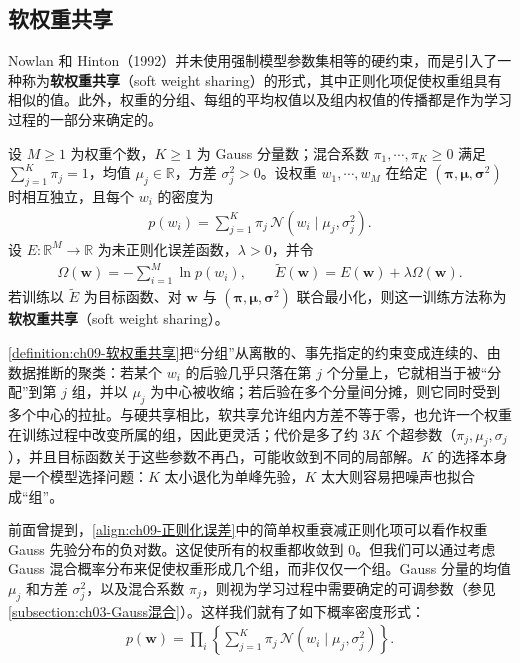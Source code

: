 \documentclass[../../main.tex]{subfiles}
\begin{document}
\subsection{软权重共享}\label{subsection:ch09-软权重共享}

Nowlan 和 Hinton（1992）并未使用强制模型参数集相等的硬约束，而是引入了一种称为\textbf{软权重共享}（soft weight sharing）的形式，其中正则化项促使权重组具有相似的值。此外，权重的分组、每组的平均权值以及组内权值的传播都是作为学习过程的一部分来确定的。

\begin{definition}[软权重共享]\label{definition:ch09-软权重共享}
设 $M\geqslant1$ 为权重个数，$K\geqslant1$ 为 Gauss 分量数；混合系数 $\pi_{1},\cdots,\pi_{K}\geqslant0$ 满足 $\sum_{j=1}^{K}\pi_{j}=1$，均值 $\mu_{j}\in\mathbb{R}$，方差 $\sigma_{j}^{2}>0$。设权重 $w_{1},\cdots,w_{M}$ 在给定 $(\boldsymbol{\pi},\boldsymbol{\mu},\boldsymbol{\sigma}^{2})$ 时相互独立，且每个 $w_{i}$ 的密度为
\begin{align*}
p(w_{i})=\sum_{j=1}^{K}\pi_{j}\,\mathcal{N}\!\left(w_{i}\mid\mu_{j},\sigma_{j}^{2}\right).
\end{align*}
设 $E:\mathbb{R}^{M}\to\mathbb{R}$ 为未正则化误差函数，$\lambda>0$，并令
\begin{align*}
\Omega(\boldsymbol{w})=-\sum_{i=1}^{M}\ln p(w_{i}),\qquad \widetilde{E}(\boldsymbol{w})=E(\boldsymbol{w})+\lambda\Omega(\boldsymbol{w}).
\end{align*}
若训练以 $\widetilde{E}$ 为目标函数、对 $\boldsymbol{w}$ 与 $(\boldsymbol{\pi},\boldsymbol{\mu},\boldsymbol{\sigma}^{2})$ 联合最小化，则这一训练方法称为\textbf{软权重共享}（soft weight sharing）。
\end{definition}

\begin{remark}\cref{definition:ch09-软权重共享}把“分组”从离散的、事先指定的约束变成连续的、由数据推断的聚类：若某个 $w_{i}$ 的后验几乎只落在第 $j$ 个分量上，它就相当于被“分配”到第 $j$ 组，并以 $\mu_{j}$ 为中心被收缩；若后验在多个分量间分摊，则它同时受到多个中心的拉扯。与硬共享相比，软共享允许组内方差不等于零，也允许一个权重在训练过程中改变所属的组，因此更灵活；代价是多了约 $3K$ 个超参数（$\pi_{j},\mu_{j},\sigma_{j}$），并且目标函数关于这些参数不再凸，可能收敛到不同的局部解。$K$ 的选择本身是一个模型选择问题：$K$ 太小退化为单峰先验，$K$ 太大则容易把噪声也拟合成“组”。
\end{remark}

前面曾提到，\eqref{align:ch09-正则化误差}中的简单权重衰减正则化项可以看作权重 Gauss 先验分布的负对数。这促使所有的权重都收敛到 $0$。但我们可以通过考虑 Gauss 混合概率分布来促使权重形成几个组，而非仅仅一个组。Gauss 分量的均值 $\mu_{j}$ 和方差 $\sigma_{j}^{2}$，以及混合系数 $\pi_{j}$，则视为学习过程中需要确定的可调参数（参见\cref{subsection:ch03-Gauss混合}）。这样我们就有了如下概率密度形式：
\begin{align}
p(\boldsymbol{w})=\prod_{i}\left\{\sum_{j=1}^{K}\pi_{j}\,\mathcal{N}\!\left(w_{i}\mid\mu_{j},\sigma_{j}^{2}\right)\right\}.
\label{align:ch09-Gauss混合先验}
\end{align}
\end{document}
